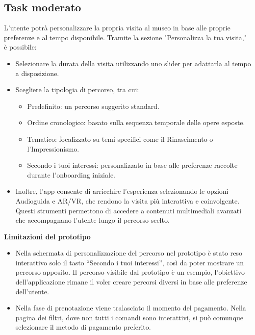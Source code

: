 \documentclass{article}
\begin{document}
\subsection{Task moderato}
L'utente potrà personalizzare la propria visita al museo in base alle proprie preferenze e al tempo disponibile. Tramite la sezione  "Personalizza la tua visita," è possibile:
\begin{itemize}
\item Selezionare la durata della visita utilizzando uno slider per adattarla al tempo a disposizione.
\item Scegliere la tipologia di percorso, tra cui: 
\begin{itemize}
\item Predefinito: un percorso suggerito standard.
\item Ordine cronologico: basato sulla sequenza temporale delle opere esposte.
\item Tematico: focalizzato su temi specifici come il Rinascimento o l’Impressionismo.
\item Secondo i tuoi interessi: personalizzato in base alle preferenze raccolte durante l’onboarding iniziale.
\end{itemize}
\item Inoltre, l’app consente di arricchire l’esperienza selezionando le opzioni Audioguida e AR/VR, che rendono la visita più interattiva e coinvolgente. Questi strumenti permettono di accedere a contenuti multimediali avanzati che accompagnano l’utente lungo il percorso scelto.
\end{itemize}
\textbf{Limitazioni del prototipo}
\begin{itemize}
\item Nella schermata di personalizzazione del percorso nel prototipo è stato reso interattivo solo il tasto “Secondo i tuoi interessi”, così da poter mostrare un percorso apposito. Il percorso visibile dal prototipo è un esempio, l’obiettivo dell’applicazione rimane il voler creare percorsi diversi in base alle preferenze dell’utente.
\item Nella fase di prenotazione viene tralasciato il momento del pagamento. Nella pagina dei filtri, dove non tutti i comandi sono interattivi, si può comunque selezionare il metodo di pagamento preferito.
\end{itemize}
\end{document}

